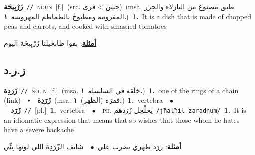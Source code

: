 \documentclass[10pt,a4paper,twoside]{article} %
\begin{document}
\begin{multicols}{2}
{\setlength\topsep{0pt}\textbf{\foreignlanguage{arabic}{زَرْبِيحَة}}\ {\color{gray}\texttt{//}\color{black}}\ \textsc{noun}\ [f.]\ (src. \color{gray}\foreignlanguage{arabic}{جنين > قرى}\color{black})\ \color{gray}(msa. \foreignlanguage{arabic}{طبق مصنوع من البازلاء والجزر المفرومة ومطبوخ بالطماطم المهروسة}~\foreignlanguage{arabic}{\textbf{١.}})\color{black}\ \textbf{1.}~It is a dish that is made of chopped peas and carrots, and cooked with smashed tomatoes\  \begin{flushright}\color{gray}\foreignlanguage{arabic}{\textbf{\underline{\foreignlanguage{arabic}{أمثلة}}}: بقوا طابخيلنا زَرْبِيحَة اليوم}\end{flushright}\color{black}} \vspace{2mm}

\vspace{-3mm}
\subsection*{\color{blue}\foreignlanguage{arabic}{ز.ر.د}\color{blue}{}} 

{\setlength\topsep{0pt}\textbf{\foreignlanguage{arabic}{زَرَدِة}}\ {\color{gray}\texttt{//}\color{black}}\ \textsc{noun}\ [f.]\ \color{gray}(msa. \foreignlanguage{arabic}{حَلَقة في السلسلة}~\foreignlanguage{arabic}{\textbf{١.}})\color{black}\ \textbf{1.}~one of the rings of a chain (link)\ \ $\smblkdiamond$\ \ \setlength\topsep{0pt}\textbf{\foreignlanguage{arabic}{زَرَدِة}}\ \color{gray}(msa. \foreignlanguage{arabic}{فقرَة (الظهر)}~\foreignlanguage{arabic}{\textbf{١.}})\color{black}\ \textbf{1.}~vertebra\ \ $\bullet$\ \ \setlength\topsep{0pt}\textbf{\foreignlanguage{arabic}{زَرَد}}\ {\color{gray}\texttt{//}\color{black}}\ [pl.]\ \textbf{1.}~vertebra\ \ $\bullet$\ \ \textsc{ph.} \color{gray} \foreignlanguage{arabic}{يحلْحِل زَرَدهم}\color{black}\ {\color{gray}\texttt{/{\sffamily jħalħil zaradhum}/}\color{black}}\ \textbf{1.}~It is an idiomatic expression that means that sb wishes that those whom he hates have a severe backache\  \begin{flushright}\color{gray}\foreignlanguage{arabic}{\textbf{\underline{\foreignlanguage{arabic}{أمثلة}}}: زرَد ظهري بضرب علي\ $\bullet$\ \  شايف الزّرَدِة اللي لونها بِنِّي}\end{flushright}\color{black}} \vspace{2mm}


\end{multicols}
\end{document}
